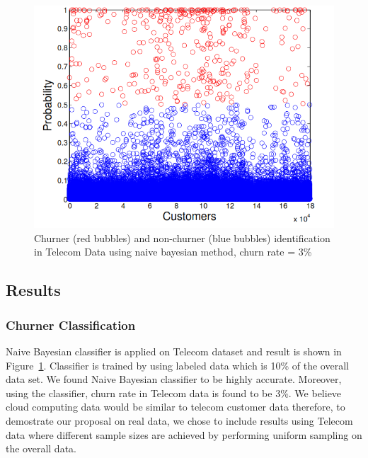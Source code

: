 \begin{figure}[!h]
\centering
\includegraphics[scale = 0.52]{pic/churn.png}
\caption{ Churner (red bubbles) and non-churner (blue bubbles) identification in Telecom Data using naive bayesian method, churn rate = 3\%}
\label{Churnerclassification}
\end{figure}

\subsection{Results}

\subsubsection{Churner Classification} Naive Bayesian classifier is applied on Telecom dataset and result is shown in Figure~\ref{Churnerclassification}. Classifier is trained by using labeled data which is 10\% of the overall data set. We found Naive Bayesian classifier to be highly accurate. Moreover, using the classifier, churn rate in Telecom data is found to be 3\%. We believe cloud computing data would be similar to telecom customer data therefore, to demostrate our proposal on real data, we chose to  include results using Telecom data where different sample sizes are achieved by performing uniform sampling on the overall data. 

